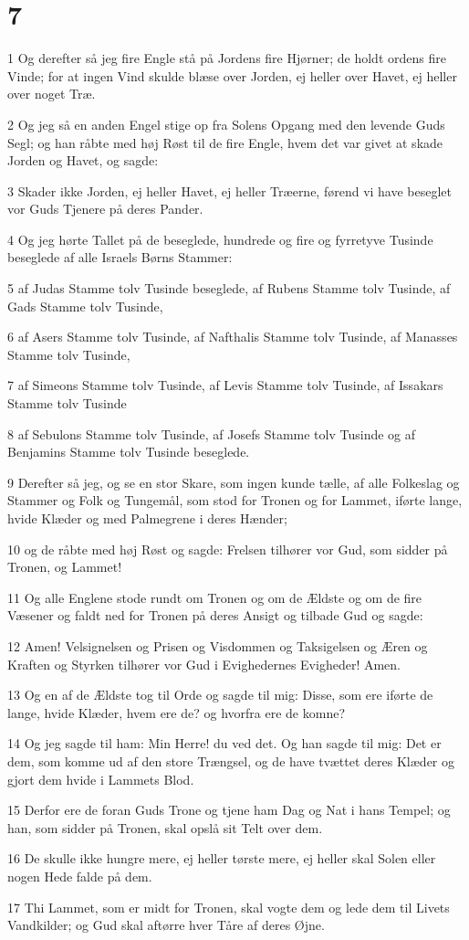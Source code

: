 \chapter{7}

\par 1 Og derefter så jeg fire Engle stå på Jordens fire Hjørner; de holdt ordens fire Vinde; for at ingen Vind skulde blæse over Jorden, ej heller over Havet, ej heller over noget Træ.
\par 2 Og jeg så en anden Engel stige op fra Solens Opgang med den levende Guds Segl; og han råbte med høj Røst til de fire Engle, hvem det var givet at skade Jorden og Havet, og sagde:
\par 3 Skader ikke Jorden, ej heller Havet, ej heller Træerne, førend vi have beseglet vor Guds Tjenere på deres Pander.
\par 4 Og jeg hørte Tallet på de beseglede, hundrede og fire og fyrretyve Tusinde beseglede af alle Israels Børns Stammer:
\par 5 af Judas Stamme tolv Tusinde beseglede, af Rubens Stamme tolv Tusinde, af Gads Stamme tolv Tusinde,
\par 6 af Asers Stamme tolv Tusinde, af Nafthalis Stamme tolv Tusinde, af Manasses Stamme tolv Tusinde,
\par 7 af Simeons Stamme tolv Tusinde, af Levis Stamme tolv Tusinde, af Issakars Stamme tolv Tusinde
\par 8 af Sebulons Stamme tolv Tusinde, af Josefs Stamme tolv Tusinde og af Benjamins Stamme tolv Tusinde beseglede.
\par 9 Derefter så jeg, og se en stor Skare, som ingen kunde tælle, af alle Folkeslag og Stammer og Folk og Tungemål, som stod for Tronen og for Lammet, iførte lange, hvide Klæder og med Palmegrene i deres Hænder;
\par 10 og de råbte med høj Røst og sagde: Frelsen tilhører vor Gud, som sidder på Tronen, og Lammet!
\par 11 Og alle Englene stode rundt om Tronen og om de Ældste og om de fire Væsener og faldt ned for Tronen på deres Ansigt og tilbade Gud og sagde:
\par 12 Amen! Velsignelsen og Prisen og Visdommen og Taksigelsen og Æren og Kraften og Styrken tilhører vor Gud i Evighedernes Evigheder! Amen.
\par 13 Og en af de Ældste tog til Orde og sagde til mig: Disse, som ere iførte de lange, hvide Klæder, hvem ere de? og hvorfra ere de komne?
\par 14 Og jeg sagde til ham: Min Herre! du ved det. Og han sagde til mig: Det er dem, som komme ud af den store Trængsel, og de have tvættet deres Klæder og gjort dem hvide i Lammets Blod.
\par 15 Derfor ere de foran Guds Trone og tjene ham Dag og Nat i hans Tempel; og han, som sidder på Tronen, skal opslå sit Telt over dem.
\par 16 De skulle ikke hungre mere, ej heller tørste mere, ej heller skal Solen eller nogen Hede falde på dem.
\par 17 Thi Lammet, som er midt for Tronen, skal vogte dem og lede dem til Livets Vandkilder; og Gud skal aftørre hver Tåre af deres Øjne.


